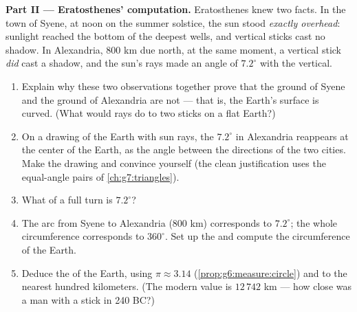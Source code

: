 \begin{problem}
\medskip
\noindent\textbf{Part II --- Eratosthenes' computation.}
Eratosthenes knew two facts. In the town of Syene, at noon on the
summer solstice, the sun stood \emph{exactly overhead}: sunlight
reached the bottom of the deepest wells, and vertical sticks cast
no shadow. In Alexandria, $800$ km due north, at the same moment,
a vertical stick \emph{did} cast a shadow, and the sun's rays
made an angle of $7.2^\circ$ with the vertical.
\begin{enumerate}[resume]
  \item Explain why these two observations together prove that
        the ground of Syene and the ground of Alexandria are not
         --- that is, the Earth's surface is curved.
        (What would  rays do to two sticks on a flat
        Earth?)
  \item On a drawing of the  Earth with  sun rays,
        the $7.2^\circ$ in Alexandria reappears at the center of
        the Earth, as the angle between the directions of the
        two cities. Make the drawing and convince yourself (the
        clean justification uses the equal-angle pairs of
        \cref{ch:g7:triangles}).
  \item What  of a full turn is $7.2^\circ$?
  \item The arc from Syene to Alexandria ($800$ km) corresponds
        to $7.2^\circ$; the whole circumference corresponds to
        $360^\circ$. Set up the  and compute the
        circumference of the Earth.
  \item Deduce the  of the Earth, using $\pi \approx
        3.14$ (\cref{prop:g6:measure:circle}) and  to
        the nearest hundred kilometers. (The modern value is
        $12\,742$ km --- how close was a man with a stick in
        240 BC?)
\end{enumerate}


\end{problem}
